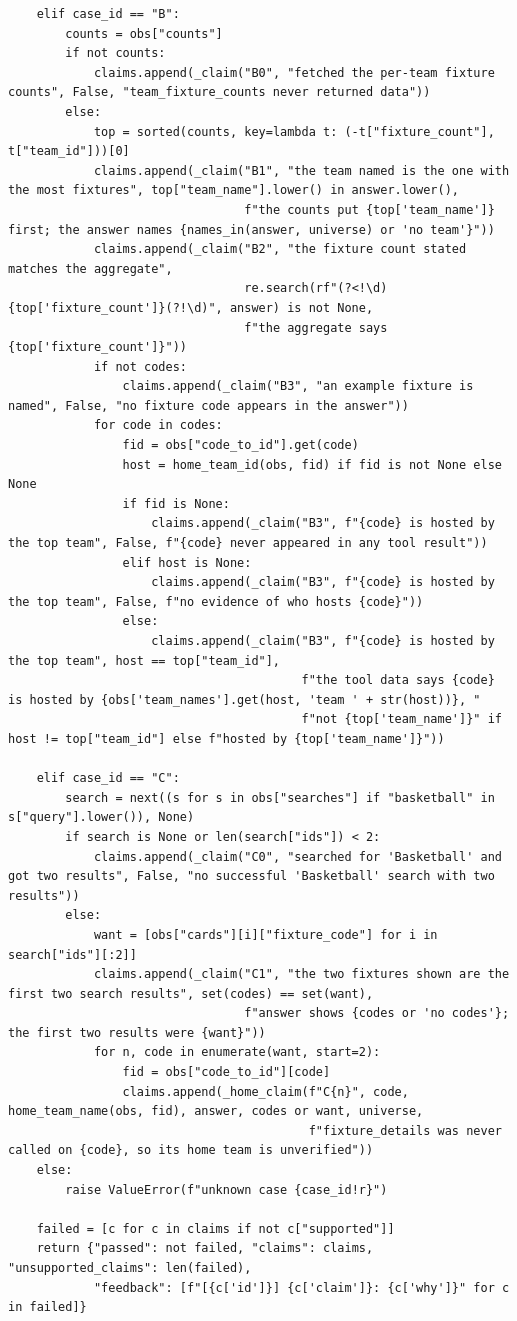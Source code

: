 \documentclass[11pt]{article}
\begin{document}
\begin{lstlisting}
    elif case_id == "B":
        counts = obs["counts"]
        if not counts:
            claims.append(_claim("B0", "fetched the per-team fixture counts", False, "team_fixture_counts never returned data"))
        else:
            top = sorted(counts, key=lambda t: (-t["fixture_count"], t["team_id"]))[0]
            claims.append(_claim("B1", "the team named is the one with the most fixtures", top["team_name"].lower() in answer.lower(),
                                 f"the counts put {top['team_name']} first; the answer names {names_in(answer, universe) or 'no team'}"))
            claims.append(_claim("B2", "the fixture count stated matches the aggregate",
                                 re.search(rf"(?<!\d){top['fixture_count']}(?!\d)", answer) is not None,
                                 f"the aggregate says {top['fixture_count']}"))
            if not codes:
                claims.append(_claim("B3", "an example fixture is named", False, "no fixture code appears in the answer"))
            for code in codes:
                fid = obs["code_to_id"].get(code)
                host = home_team_id(obs, fid) if fid is not None else None
                if fid is None:
                    claims.append(_claim("B3", f"{code} is hosted by the top team", False, f"{code} never appeared in any tool result"))
                elif host is None:
                    claims.append(_claim("B3", f"{code} is hosted by the top team", False, f"no evidence of who hosts {code}"))
                else:
                    claims.append(_claim("B3", f"{code} is hosted by the top team", host == top["team_id"],
                                         f"the tool data says {code} is hosted by {obs['team_names'].get(host, 'team ' + str(host))}, "
                                         f"not {top['team_name']}" if host != top["team_id"] else f"hosted by {top['team_name']}"))

    elif case_id == "C":
        search = next((s for s in obs["searches"] if "basketball" in s["query"].lower()), None)
        if search is None or len(search["ids"]) < 2:
            claims.append(_claim("C0", "searched for 'Basketball' and got two results", False, "no successful 'Basketball' search with two results"))
        else:
            want = [obs["cards"][i]["fixture_code"] for i in search["ids"][:2]]
            claims.append(_claim("C1", "the two fixtures shown are the first two search results", set(codes) == set(want),
                                 f"answer shows {codes or 'no codes'}; the first two results were {want}"))
            for n, code in enumerate(want, start=2):
                fid = obs["code_to_id"][code]
                claims.append(_home_claim(f"C{n}", code, home_team_name(obs, fid), answer, codes or want, universe,
                                          f"fixture_details was never called on {code}, so its home team is unverified"))
    else:
        raise ValueError(f"unknown case {case_id!r}")

    failed = [c for c in claims if not c["supported"]]
    return {"passed": not failed, "claims": claims, "unsupported_claims": len(failed),
            "feedback": [f"[{c['id']}] {c['claim']}: {c['why']}" for c in failed]}
\end{lstlisting}
\endgroup
\end{document}
